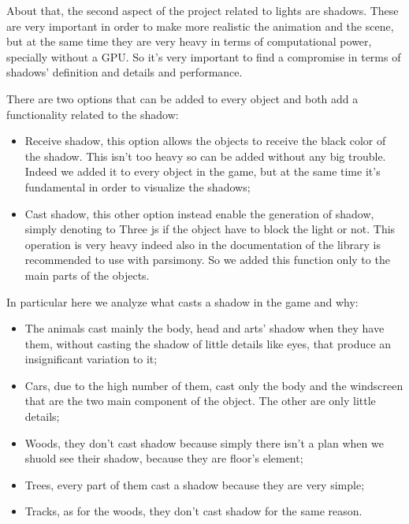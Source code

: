 \documentclass[a4paper, 11pt]{article}
\begin{document}
About that, the second aspect of the project related to lights are shadows. These are very important in order to make more realistic the animation and the scene, but at the same time they are very heavy in terms of computational power, specially without a GPU. So it's very important to find a compromise in terms of shadows' definition and details and performance. 

There are two options that can be added to every object and both add a functionality related to the shadow:
\begin{itemize}
  \item Receive shadow, this option allows the objects to receive the black color of the shadow. This isn't too heavy so can be added without any big trouble. Indeed we added it to every object in the game, but at the same time it's fundamental in order to visualize the shadows;
  \item Cast shadow, this other option instead enable the generation of shadow, simply denoting to Three js if the object have to block the light or not. This operation is very heavy indeed also in the documentation of the library is recommended to use with parsimony. So we added this function only to the main parts of the objects. 
\end{itemize}
In particular here we analyze what casts a shadow in the game and why:
\begin{itemize}
  \item The animals cast mainly the body, head and arts' shadow when they have them, without casting the shadow of little details like eyes, that produce an insignificant variation to it;
  \item Cars, due to the high number of them, cast only the body and the windscreen that are the two main component of the object. The other are only little details;
  \item Woods, they don't cast shadow because simply there isn't a plan when we shuold see their shadow, because they are floor's element;
  \item Trees, every part of them cast a shadow because they are very simple;
  \item Tracks, as for the woods, they don't cast shadow for the same reason.
\end{itemize}
\end{document}

